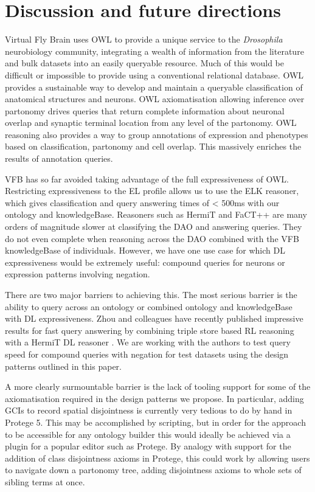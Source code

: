 \documentclass[runningheads,a4paper]{llncs}
\begin{document}
\section{Discussion and future directions}


Virtual Fly Brain uses OWL to provide a unique service to the
\textit{Drosophila} neurobiology community, integrating a wealth of
information from the literature and bulk datasets into an easily
queryable resource.  Much of this would be difficult or impossible to
provide using a conventional relational database. OWL
provides a sustainable way to develop and maintain a queryable
classification of anatomical structures and neurons.  OWL
axiomatisation allowing inference over partonomy drives queries that
 return complete information about neuronal overlap and synaptic
 terminal location from any level of the partonomy.  OWL reasoning
 also provides a way to group annotations of expression and phenotypes
 based on classification, partonomy and cell overlap.  This massively
 enriches the results of annotation queries.


VFB has so far avoided taking advantage of the full expressiveness of
OWL. Restricting expressiveness to the EL profile allows us to use the
ELK reasoner, which gives classification and query
answering times of < 500ms with our ontology and
knowledgeBase. Reasoners such as HermiT\cite{HermiT2008} and FaCT++
\cite{Fact2006}  are many orders of magnitude slower at classifying
the DAO and answering queries.  They do not even complete when
reasoning across the DAO combined with the VFB knowledgeBase of
individuals.  However, we have one use case for which DL
expressiveness would be extremely useful: compound queries for neurons
or expression patterns involving negation.

There are two major barriers to achieving this. The most serious
barrier is the ability to query across an ontology or combined ontology and
knowledgeBase with DL expressiveness.  Zhou and colleagues have
recently published impressive results for fast query answering by
combining triple store based RL reasoning with a HermiT DL reasoner
\cite{ZNCH14a}.  We are working with the authors to test query speed
for compound queries with negation for test datasets using the design
patterns outlined in this paper.

A more clearly surmountable barrier is the lack of tooling support for
some of the axiomatisation required in the design patterns we propose.  In
particular, adding GCIs to record spatial disjointness is currently
very tedious to do by hand in Protege 5.  This may be accomplished by
scripting, but in order for the approach to be accessible for any
ontology builder this would ideally be achieved via a plugin for a
popular editor such as Protege.  By analogy with support for the
addition of class disjointness axioms in Protege, this could work by allowing
users to navigate down a partonomy tree, adding disjointness axioms to
whole sets of sibling terms at once.
\end{document}

